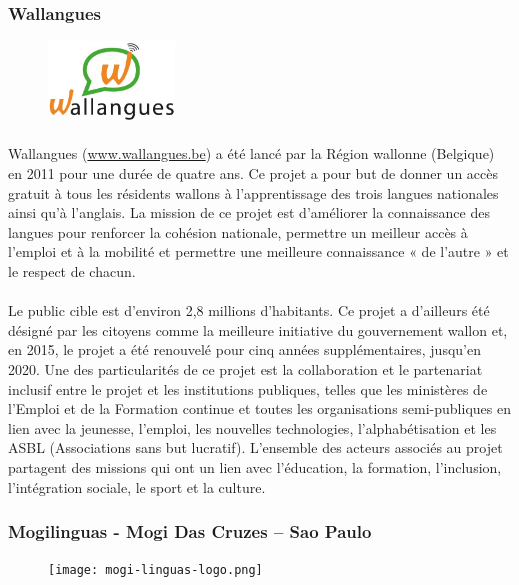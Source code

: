 \subsubsection{Wallangues}
\begin{figure}
    \centering
    \includegraphics[width=0.3\textwidth]{images/wallangues-logo.jpeg}
\end{figure}
\paragraph{}
Wallangues (\url{www.wallangues.be}) a été lancé par la Région wallonne (Belgique) en 2011 pour une durée de quatre ans. Ce projet a pour but de donner un accès gratuit à tous les résidents wallons à l’apprentissage des trois langues nationales ainsi qu’à l’anglais. La mission de ce projet est d’améliorer la connaissance des langues pour renforcer la cohésion nationale, permettre un meilleur accès à l’emploi et à la mobilité et permettre une meilleure connaissance « de l’autre » et le respect de chacun.

\paragraph{}
Le public cible est d’environ 2,8 millions d’habitants. Ce projet a d’ailleurs été désigné par les citoyens comme la meilleure initiative du gouvernement wallon et, en 2015, le projet a été renouvelé pour cinq années supplémentaires, jusqu’en 2020. Une des particularités de ce projet est la collaboration et le partenariat inclusif entre le projet et les institutions publiques, telles que les ministères de l’Emploi et de la Formation continue et toutes les organisations semi-publiques en lien avec la jeunesse, l’emploi, les nouvelles technologies, l’alphabétisation et les ASBL (Associations sans but lucratif). L’ensemble des acteurs associés au projet partagent des missions qui ont un lien avec l’éducation, la formation, l’inclusion, l’intégration sociale, le sport et la culture.

\subsubsection{Mogilinguas - Mogi Das Cruzes -- Sao Paulo}
\begin{figure}
    \centering
    \texttt{[image: mogi-linguas-logo.png]}
\end{figure}
